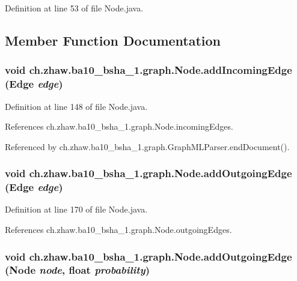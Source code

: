 Definition at line 53 of file Node.java.

\subsection{Member Function Documentation}
\hypertarget{classch_1_1zhaw_1_1ba10__bsha__1_1_1graph_1_1Node_afbf20aec55572fc6c90d2f2541d7eeed}{
\subsubsection[{addIncomingEdge}]{\setlength{\rightskip}{0pt plus 5cm}void ch.zhaw.ba10\_\-bsha\_\-1.graph.Node.addIncomingEdge ({\bf Edge} {\em edge})}}
\label{classch_1_1zhaw_1_1ba10__bsha__1_1_1graph_1_1Node_afbf20aec55572fc6c90d2f2541d7eeed}


Definition at line 148 of file Node.java.

References ch.zhaw.ba10\_\-bsha\_\-1.graph.Node.incomingEdges.

Referenced by ch.zhaw.ba10\_\-bsha\_\-1.graph.GraphMLParser.endDocument().\hypertarget{classch_1_1zhaw_1_1ba10__bsha__1_1_1graph_1_1Node_aeb360f45f8582ea6cda8ef9b6f074df0}{
\subsubsection[{addOutgoingEdge}]{\setlength{\rightskip}{0pt plus 5cm}void ch.zhaw.ba10\_\-bsha\_\-1.graph.Node.addOutgoingEdge ({\bf Edge} {\em edge})}}
\label{classch_1_1zhaw_1_1ba10__bsha__1_1_1graph_1_1Node_aeb360f45f8582ea6cda8ef9b6f074df0}


Definition at line 170 of file Node.java.

References ch.zhaw.ba10\_\-bsha\_\-1.graph.Node.outgoingEdges.\hypertarget{classch_1_1zhaw_1_1ba10__bsha__1_1_1graph_1_1Node_aeb5d29fd379ad2b13cadbac51f880390}{
\subsubsection[{addOutgoingEdge}]{\setlength{\rightskip}{0pt plus 5cm}void ch.zhaw.ba10\_\-bsha\_\-1.graph.Node.addOutgoingEdge ({\bf Node} {\em node}, \/  float {\em probability})}}
\label{classch_1_1zhaw_1_1ba10__bsha__1_1_1graph_1_1Node_aeb5d29fd379ad2b13cadbac51f880390}


